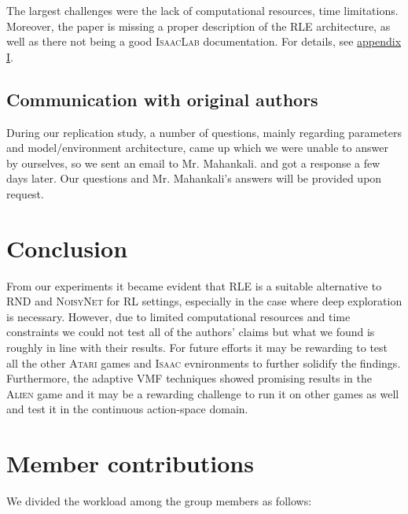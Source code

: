 \documentclass[10pt]{article} %
\begin{document}
The largest challenges were the lack of computational resources, time limitations. Moreover, the paper is missing a proper description of the \textsc{RLE} architecture, as well as there not being a good \textsc{IsaacLab} documentation. For details, see \hyperlink{appendix-difficult}{appendix I}.

\subsection{Communication with original authors}

During our replication study, a number of questions, mainly regarding parameters and model/environment architecture, came up which we were unable to answer by ourselves, so we sent an email to Mr. Mahankali. and got a response a few days later. Our questions and Mr. Mahankali's answers will be provided upon request. 

\vspace{-3pt}
\section{Conclusion}
\vspace{-3pt}

From our experiments it became evident that \textsc{RLE} is a suitable alternative to \textsc{RND} and \textsc{NoisyNet} for RL settings, especially in the case where deep exploration is necessary. However, due to limited computational resources and time constraints we could not test all of the authors' claims but what we found is roughly in line with their results. For future efforts it may be rewarding to test all the other \textsc{Atari} games and \textsc{Isaac} evnironments to further solidify the findings. Furthermore, the adaptive VMF techniques showed promising results in the \textsc{Alien} game and it may be a rewarding challenge to run it on other games as well and test it in the continuous action-space domain.

\clearpage
\section*{Member contributions}

We divided the workload among the group members as follows:
\end{document}
